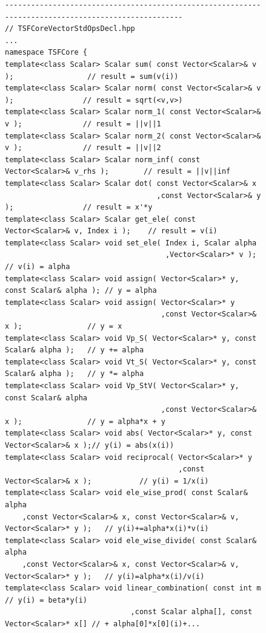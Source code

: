 {\bsinglespace
\begin{figure}[p]
\begin{minipage}{\textwidth}
{\scriptsize\begin{verbatim}
----------------------------------------------------------------------------------------------------
// TSFCoreVectorStdOpsDecl.hpp
...
namespace TSFCore {
template<class Scalar> Scalar sum( const Vector<Scalar>& v );                 // result = sum(v(i))
template<class Scalar> Scalar norm( const Vector<Scalar>& v );                // result = sqrt(<v,v>)
template<class Scalar> Scalar norm_1( const Vector<Scalar>& v );              // result = ||v||1
template<class Scalar> Scalar norm_2( const Vector<Scalar>& v );              // result = ||v||2
template<class Scalar> Scalar norm_inf( const Vector<Scalar>& v_rhs );        // result = ||v||inf
template<class Scalar> Scalar dot( const Vector<Scalar>& x
                                   ,const Vector<Scalar>& y );                // result = x'*y
template<class Scalar> Scalar get_ele( const Vector<Scalar>& v, Index i );    // result = v(i)
template<class Scalar> void set_ele( Index i, Scalar alpha
                                     ,Vector<Scalar>* v );                    // v(i) = alpha
template<class Scalar> void assign( Vector<Scalar>* y, const Scalar& alpha ); // y = alpha
template<class Scalar> void assign( Vector<Scalar>* y
                                    ,const Vector<Scalar>& x );               // y = x
template<class Scalar> void Vp_S( Vector<Scalar>* y, const Scalar& alpha );   // y += alpha
template<class Scalar> void Vt_S( Vector<Scalar>* y, const Scalar& alpha );   // y *= alpha
template<class Scalar> void Vp_StV( Vector<Scalar>* y, const Scalar& alpha
                                    ,const Vector<Scalar>& x );               // y = alpha*x + y
template<class Scalar> void abs( Vector<Scalar>* y, const Vector<Scalar>& x );// y(i) = abs(x(i))
template<class Scalar> void reciprocal( Vector<Scalar>* y
                                        ,const Vector<Scalar>& x );           // y(i) = 1/x(i)
template<class Scalar> void ele_wise_prod( const Scalar& alpha
    ,const Vector<Scalar>& x, const Vector<Scalar>& v, Vector<Scalar>* y );   // y(i)+=alpha*x(i)*v(i)
template<class Scalar> void ele_wise_divide( const Scalar& alpha
    ,const Vector<Scalar>& x, const Vector<Scalar>& v, Vector<Scalar>* y );   // y(i)=alpha*x(i)/v(i)
template<class Scalar> void linear_combination( const int m                   // y(i) = beta*y(i)
                             ,const Scalar alpha[], const Vector<Scalar>* x[] // + alpha[0]*x[0](i)+...

\end{verbatim}}
\end{minipage}
\end{figure}}

